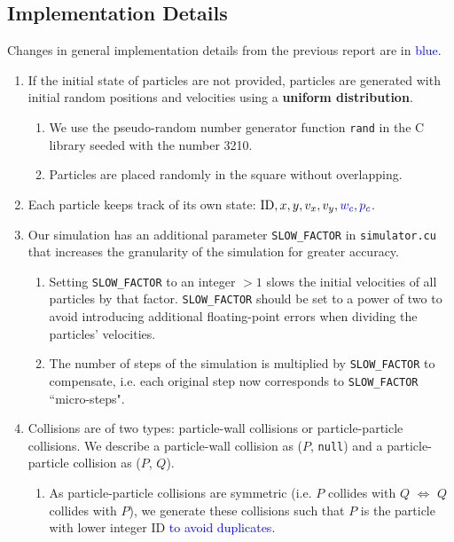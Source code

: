 \documentclass[12pt]{article}
\begin{document}
\pagebreak

\subsection{Implementation Details}

Changes in general implementation details from the previous report are in \textcolor{blue}{blue}.

\begin{enumerate}
	\item If the initial state of particles are not provided, particles are generated with initial random positions and velocities using a \textbf{uniform distribution}.
	\begin{enumerate}
		\item We use the pseudo-random number generator function \texttt{rand} in the C library seeded with the number 3210.
		\item Particles are placed randomly in the square without overlapping.
	\end{enumerate}
	\item Each particle keeps track of its own state: $\textrm{ID}, x, y, v_x, v_y, \textcolor{blue}{w_c, p_c}$.
	\item Our simulation has an additional parameter \texttt{SLOW\_FACTOR} in \texttt{simulator.cu} that increases the granularity of the simulation for greater accuracy. \label{slow-factor-ref}
	\begin{enumerate}
		\item Setting \texttt{SLOW\_FACTOR} to an integer $>1$ slows the initial velocities of all particles by that factor. \texttt{SLOW\_FACTOR} should be set to a power of two to avoid introducing additional floating-point errors when dividing the particles’ velocities.
		\item The number of steps of the simulation is multiplied by \texttt{SLOW\_FACTOR} to compensate, i.e. each original step now corresponds to \texttt{SLOW\_FACTOR} ``micro-steps".
	\end{enumerate}
	\item Collisions are of two types: particle-wall collisions or particle-particle collisions. We describe a particle-wall collision as ($P$, \texttt{null}) and a particle-particle collision as ($P$, $Q$).
	\begin{enumerate}
		\item As particle-particle collisions are symmetric (i.e. $P$ collides with $Q$ $\iff$ $Q$ collides with $P$), we generate these collisions such that $P$ is the particle with lower integer ID \textcolor{blue}{to avoid duplicates}.

\end{enumerate}
\end{enumerate}
\end{document}
